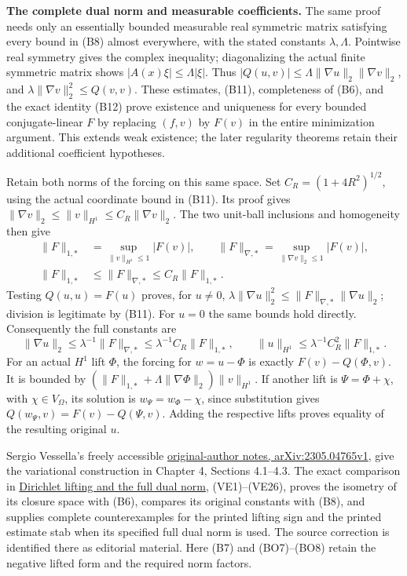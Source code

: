 \documentclass[
  11pt,
]{article}
\begin{document}
\textbf{The complete dual norm and measurable coefficients.} The same
proof needs only an essentially bounded measurable real symmetric matrix
satisfying every bound in (B8) almost everywhere, with the stated
constants \(\lambda,\Lambda\). Pointwise real symmetry gives the complex
inequality; diagonalizing the actual finite symmetric matrix shows
\(|A(x)\xi|\leq\Lambda|\xi|\). Thus
\(|Q(u,v)|\leq\Lambda\|\nabla u\|_2\|\nabla v\|_2\), and
\(\lambda\|\nabla v\|_2^2\leq Q(v,v)\). These estimates, (B11),
completeness of (B6), and the exact identity (B12) prove existence and
uniqueness for every bounded conjugate-linear \(F\) by replacing
\((f,v)\) by \(F(v)\) in the entire minimization argument. This extends
weak existence; the later regularity theorems retain their additional
coefficient hypotheses.

Retain both norms of the forcing on this same space. Set
\(C_R=(1+4R^2)^{1/2}\), using the actual coordinate bound in (B11). Its
proof gives \(\|\nabla v\|_2\leq\|v\|_{H^1}\leq C_R\|\nabla v\|_2\). The
two unit-ball inclusions and homogeneity then give \[
 \begin{split}
 \|F\|_{1,*}&=\sup_{\|v\|_{H^1}\leq1}|F(v)|,\qquad
 \|F\|_{\nabla,*}=\sup_{\|\nabla v\|_2\leq1}|F(v)|,\\
 \|F\|_{1,*}&\leq\|F\|_{\nabla,*}\leq C_R\|F\|_{1,*}.
 \end{split}
 \tag{BO7}
\] Testing \(Q(u,u)=F(u)\) proves, for \(u\ne0\),
\(\lambda\|\nabla u\|_2^2\leq\|F\|_{\nabla,*}\|\nabla u\|_2\); division
is legitimate by (B11). For \(u=0\) the same bounds hold directly.
Consequently the full constants are \[
 \|\nabla u\|_2\leq\lambda^{-1}\|F\|_{\nabla,*}
            \leq\lambda^{-1}C_R\|F\|_{1,*},\qquad
 \|u\|_{H^1}\leq\lambda^{-1}C_R^2\|F\|_{1,*}.
 \tag{BO8}
\] For an actual \(H^1\) lift \(\Phi\), the forcing for \(w=u-\Phi\) is
exactly \(F(v)-Q(\Phi,v)\). It is bounded by
\((\|F\|_{1,*}+\Lambda\|\nabla\Phi\|_2)\|v\|_{H^1}\). If another lift is
\(\Psi=\Phi+\chi\), with \(\chi\in V_\Omega\), its solution is
\(w_\Psi=w_\Phi-\chi\), since substitution gives
\(Q(w_\Psi,v)=F(v)-Q(\Psi,v)\). Adding the respective lifts proves
equality of the resulting original \(u\).

Sergio Vessella's freely accessible
\href{https://arxiv.org/abs/2305.04765v1}{original-author notes,
arXiv:2305.04765v1}, give the variational construction in Chapter 4,
Sections 4.1--4.3. The exact comparison in
\href{../supplements/vessella-dirichlet-comparison.html}{Dirichlet
lifting and the full dual norm}, (VE1)--(VE26), proves the isometry of
its closure space with (B6), compares its original constants with (B8),
and supplies complete counterexamples for the printed lifting sign and
the printed estimate stab when its specified full dual norm is used. The
source correction is identified there as editorial material. Here (B7)
and (BO7)--(BO8) retain the negative lifted form and the required norm
factors.
\end{document}
